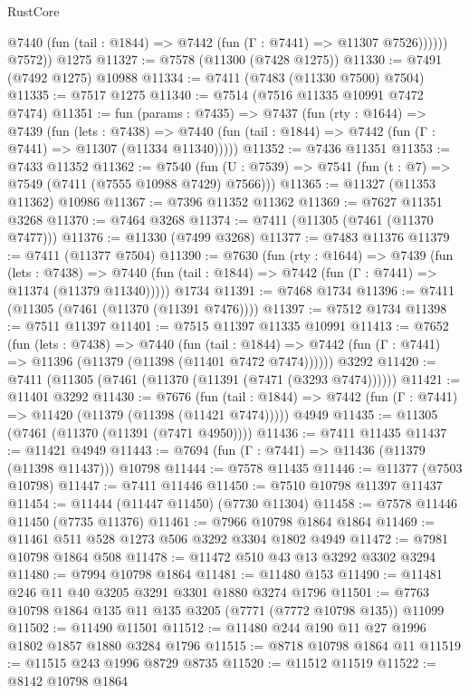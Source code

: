 \begin{lexlean}{RustCore}
\begin{coremodule}
              @7440 (fun (tail : @1844) => @7442 (fun (Γ : @7441) => @11307 @7526))))))
        @7572))
    @1275
@11327 := @7578 (@11300 (@7428 @1275))
@11330 := @7491 (@7492 @1275) @10988
@11334 := @7411 (@7483 (@11330 @7500) @7504)
@11335 := @7517 @1275
@11340 := @7514 (@7516 @11335 @10991 @7472 @7474)
@11351 := fun (params : @7435) =>
  @7437
    (fun (rty : @1644) =>
    @7439
      (fun (lets : @7438) =>
      @7440 (fun (tail : @1844) => @7442 (fun (Γ : @7441) => @11307 (@11334 @11340)))))
@11352 := @7436 @11351
@11353 := @7433 @11352
@11362 := @7540
    (fun (U : @7539) => @7541 (fun (t : @7) => @7549 (@7411 (@7555 @10988 @7429) @7566)))
@11365 := @11327 (@11353 @11362) @10986
@11367 := @7396 @11352 @11362
@11369 := @7627 @11351 @3268
@11370 := @7464 @3268
@11374 := @7411 (@11305 (@7461 (@11370 @7477)))
@11376 := @11330 (@7499 @3268)
@11377 := @7483 @11376
@11379 := @7411 (@11377 @7504)
@11390 := @7630
    (fun (rty : @1644) =>
    @7439
      (fun (lets : @7438) =>
      @7440 (fun (tail : @1844) => @7442 (fun (Γ : @7441) => @11374 (@11379 @11340)))))
    @1734
@11391 := @7468 @1734
@11396 := @7411 (@11305 (@7461 (@11370 (@11391 @7476))))
@11397 := @7512 @1734
@11398 := @7511 @11397
@11401 := @7515 @11397 @11335 @10991
@11413 := @7652
    (fun (lets : @7438) =>
    @7440
      (fun (tail : @1844) =>
      @7442 (fun (Γ : @7441) => @11396 (@11379 (@11398 (@11401 @7472 @7474))))))
    @3292
@11420 := @7411 (@11305 (@7461 (@11370 (@11391 (@7471 (@3293 @7474))))))
@11421 := @11401 @3292
@11430 := @7676
    (fun (tail : @1844) => @7442 (fun (Γ : @7441) => @11420 (@11379 (@11398 (@11421 @7474)))))
    @4949
@11435 := @11305 (@7461 (@11370 (@11391 (@7471 @4950))))
@11436 := @7411 @11435
@11437 := @11421 @4949
@11443 := @7694 (fun (Γ : @7441) => @11436 (@11379 (@11398 @11437))) @10798
@11444 := @7578 @11435
@11446 := @11377 (@7503 @10798)
@11447 := @7411 @11446
@11450 := @7510 @10798 @11397 @11437
@11454 := @11444 (@11447 @11450) (@7730 @11304)
@11458 := @7578 @11446 @11450 (@7735 @11376)
@11461 := @7966 @10798 @1864 @1864
@11469 := @11461 @511 @528 @1273 @506 @3292 @3304 @1802 @4949
@11472 := @7981 @10798 @1864 @508
@11478 := @11472 @510 @43 @13 @3292 @3302 @3294
@11480 := @7994 @10798 @1864
@11481 := @11480 @153
@11490 := @11481 @246 @11 @40 @3205 @3291 @3301 @1880 @3274 @1796
@11501 := @7763 @10798 @1864 @135 @11 @135 @3205 (@7771 (@7772 @10798 @135)) @11099
@11502 := @11490 @11501
@11512 := @11480 @244 @190 @11 @27 @1996 @1802 @1857 @1880 @3284 @1796
@11515 := @8718 @10798 @1864 @11
@11519 := @11515 @243 @1996 @8729 @8735
@11520 := @11512 @11519
@11522 := @8142 @10798 @1864

\end{coremodule}
\end{lexlean}
